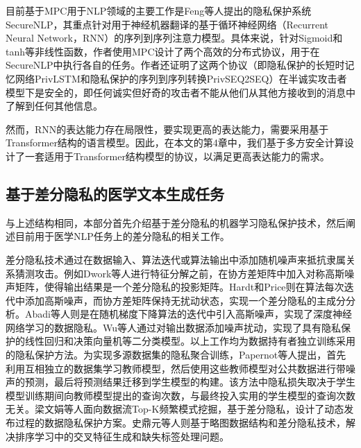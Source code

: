 目前基于MPC用于NLP领域的主要工作是Feng等人\cite{SecureNLP}提出的隐私保护系统SecureNLP，其重点针对用于神经机器翻译的基于循环神经网络（Recurrent Neural Network，RNN）的序列到序列注意力模型。具体来说，针对Sigmoid和tanh等非线性函数，作者使用MPC设计了两个高效的分布式协议，用于在SecureNLP中执行各自的任务。作者还证明了这两个协议（即隐私保护的长短时记忆网络PrivLSTM和隐私保护的序列到序列转换PrivSEQ2SEQ）在半诚实攻击者模型下是安全的，即任何诚实但好奇的攻击者不能从他们从其他方接收到的消息中了解到任何其他信息。


然而，RNN的表达能力存在局限性，要实现更高的表达能力，需要采用基于Transformer结构的语言模型。因此，在本文的第4章中，我们基于多方安全计算设计了一套适用于Transformer结构模型的协议，以满足更高表达能力的需求。

\subsection{基于差分隐私的医学文本生成任务}

与上述结构相同，本部分首先介绍基于差分隐私的机器学习隐私保护技术，然后阐述目前用于医学NLP任务上的差分隐私的相关工作。

差分隐私技术通过在数据输入、算法迭代或算法输出中添加随机噪声来抵抗隶属关系猜测攻击。例如Dwork等人\cite{DP}进行特征分解之前，在协方差矩阵中加入对称高斯噪声矩阵，使得输出结果是一个差分隐私的投影矩阵。Hardt和Price\cite{hardt2014noisy}则在算法每次迭代中添加高斯噪声，而协方差矩阵保持无扰动状态，实现一个差分隐私的主成分分析。Abadi\cite{abadi2016deep}等人则是在随机梯度下降算法的迭代中引入高斯噪声，实现了深度神经网络学习的数据隐私。Wu等人\cite{wu2018training}通过对输出数据添加噪声扰动，实现了具有隐私保护的线性回归和决策向量机等二分类模型。以上工作均为数据持有者独立训练采用的隐私保护方法。为实现多源数据集的隐私聚合训练，Papernot\cite{papernot2016semi}等人提出，首先利用互相独立的数据集学习教师模型，然后使用这些教师模型对公共数据进行带噪声的预测，最后将预测结果迁移到学生模型的构建。该方法中隐私损失取决于学生模型训练期间向教师模型提出的查询次数，与最终投入实用的学生模型的查询次数无关。梁文娟等人面向数据流Top-K频繁模式挖掘，基于差分隐私，设计了动态发布过程的数据隐私保护方案。史鼎元\cite{CDFL}等人则基于略图数据结构和差分隐私技术，解决排序学习中的交叉特征生成和缺失标签处理问题。

